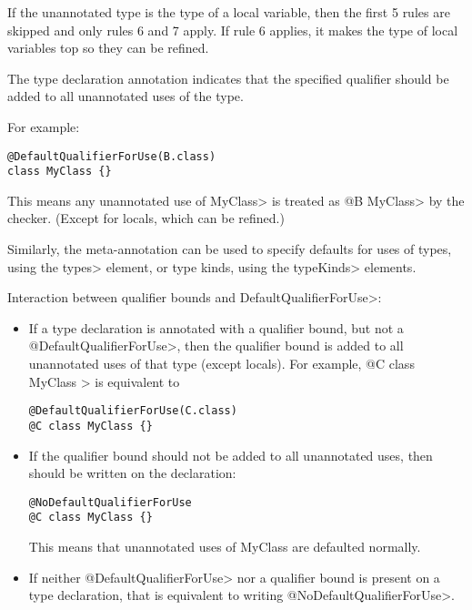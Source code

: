 If the unannotated type is the type of a local variable, then the first 5 rules are skipped and only
rules 6 and 7 apply. If rule 6 applies, it makes the type of local variables top so they can be refined.


The type declaration annotation 
indicates that the specified qualifier should be added to all unannotated uses of the type.

For example:
\begin{Verbatim}
@DefaultQualifierForUse(B.class)
class MyClass {}
\end{Verbatim}

This means any unannotated use of \<MyClass> is treated as \<@B MyClass> by the checker.
(Except for locals, which can be refined.)

Similarly, the meta-annotation  can be used to specify defaults
for uses of types, using the \<types> element, or type kinds, using the \<typeKinds> elements.

Interaction between qualifier bounds and \<DefaultQualifierForUse>:
\begin{itemize}
\item
  If a type declaration is annotated with a qualifier bound, but not a \<@DefaultQualifierForUse>,
  then the qualifier bound is added to all unannotated uses of that type (except locals).
  For example, \<@C class MyClass {}> is equivalent to
\begin{Verbatim}
@DefaultQualifierForUse(C.class)
@C class MyClass {}
\end{Verbatim}

\item
  If the qualifier bound should not be added to all unannotated uses, then
   should be written on the declaration:
\begin{Verbatim}
@NoDefaultQualifierForUse
@C class MyClass {}
\end{Verbatim}
  This means that unannotated uses of MyClass are defaulted normally.
\item
  If neither \<@DefaultQualifierForUse> nor a qualifier bound is present on a type declaration, that
  is equivalent to writing \<@NoDefaultQualifierForUse>.

\end{itemize}


